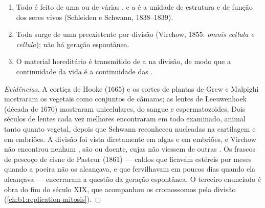 \begin{proposition}\label{prop:b1:cell-unit-of-life:theory}
\begin{enumerate}
  \item Todo  é feito de uma ou de várias , e a  é
        a unidade de estrutura e de função dos seres vivos (Schleiden e
        Schwann, 1838--1839).
  \item Toda  surge de uma  preexistente por divisão
        (Virchow, 1855: \emph{omnis cellula e cellula}); não há geração
        espontânea.
  \item O material hereditário é transmitido de  a  na
        divisão, de modo que a continuidade da vida é a continuidade das
        .
\end{enumerate}
\end{proposition}
\begin{proof}[Evidências]
A cortiça de Hooke (1665) e os cortes de plantas de Grew e Malpighi
mostraram os  vegetais como conjuntos de câmaras; as lentes de
Leeuwenhoek (década de 1670) mostraram  unicelulares, 
do sangue e espermatozoides. Dois séculos de lentes cada vez melhores
encontraram  em todo  examinado, animal tanto quanto
vegetal, depois que Schwann reconheceu  nucleadas na cartilagem e
em embriões. A divisão foi vista diretamente em algas e em embriões, e
Virchow não encontrou nenhum , são ou doente, cujas  não
viessem de outras . Os frascos de pescoço de cisne de Pasteur
(1861) --- caldos que ficavam estéreis por meses quando a poeira não os
alcançava, e que fervilhavam em poucos dias quando ela alcançava ---
encerraram a questão da geração espontânea. O terceiro enunciado é obra
do fim do século XIX, que acompanhou os cromossomos pela divisão
(\cref{ch:b1:replication-mitosis}).
\end{proof}

